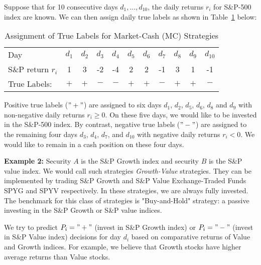 \documentclass{article}
\begin{document}
Suppose that for 10 consecutive days 
$d_{1},\ldots, d_{10}$, the daily returns $r_{i}$ for S{\&}P-500 index are known. 
We can then assign daily true labels as shown in Table~\ref{tab_true_label_assignment_market_cash} below:
\begin{table}[!ht]
    \centering
    \caption{Assignment of True Labels for Market-Cash (MC) Strategies}
    \vspace{0.1in}
    \begin{tabular}{l  c c c c  c c c c c c}
    \hline
        Day  &  $d_{1}$ & $d_{2}$ & $d_{3}$ & $d_{4}$ & $d_{5}$ & $d_{6}$ & $d_{7}$ & $d_{8}$ & $d_{9}$ & $d_{10}$ \\
        S{\&}P return $r_{i}$ &  1   & 3  & -2   & -4   & 2   & 2  & -1  & 3  & 1 & -1\\
        True Labels: & $+$ & $+$ & $-$ & $-$ & $+$ & $+$ & $-$ & $+$ & $+$ & $-$\\
        \hline
\end{tabular}
\label{tab_true_label_assignment_market_cash}
\end{table}

Positive true labels  ($"+"$) are assigned to six days $d_{1}$, $d_{2}$, $d_{5}$, $d_{6}$, $d_{8}$ and $d_{9}$ with non-negative daily returns $r_{i}\geq 0$. On these five days, we would like to be invested in the S{\&}P-500 index.
By contrast, negative true labels ($"-"$) are assigned to the remaining four days $d_{3}$, $d_{4}$, $d_{7}$, and $d_{10}$
with negative daily returns $r_{i}<0$. We would like to remain in a cash position on these four days.

\medskip
\noindent
{\bf Example 2: } Security $A$ is the S{\&}P Growth index and security $B$ is the S{\&}P value index. We would call such strategies
{\it Growth-Value} strategies. They can be implemented by
trading S{\&}P Growth and S{\&}P Value Exchange-Traded Funds SPYG and SPYV respectively.
In these strategies, we are always fully invested. The benchmark for this class of strategies is 
 "Buy-and-Hold" strategy: a passive investing in the S{\&}P Growth or S{\&}P value indices. 

We try to predict $P_{i}="+"$ (invest in S{\&}P Growth index) or
$P_{i}="-"$ (invest in S{\&}P Value index) decisions for day $d_{i}$ based on comparative returns of Value and Growth indices. For example, we believe that Growth stocks have higher average returns 
than Value stocks.
\end{document}
